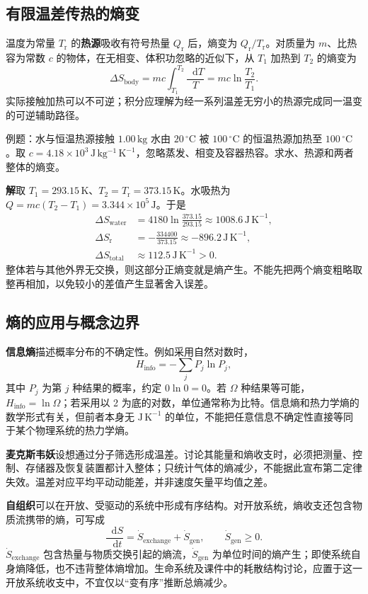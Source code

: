 \documentclass[UTF8,fontset=none,zihao=-4,a4paper]{ctexart}
\newcommand{\term}[1]{\textbf{#1}}
\newcommand{\dd}{\mathop{}\!\mathrm{d}}
\newcommand{\unit}[1]{\,\mathrm{#1}}
\newcommand{\sol}{\par\noindent\textbf{解}\quad}
\begin{document}
\subsection{有限温差传热的熵变}
温度为常量 $T_{\mathrm r}$ 的\term{热源}吸收有符号热量 $Q_{\mathrm r}$ 后，熵变为 $Q_{\mathrm r}/T_{\mathrm r}$。对质量为 $m$、比热容为常数 $c$ 的物体，在无相变、体积功忽略的近似下，从 $T_1$ 加热到 $T_2$ 的熵变为
\[
 \Delta S_{\mathrm{body}}=mc\int_{T_1}^{T_2}\frac{\dd T}{T}
 =mc\ln\frac{T_2}{T_1}.
\]
实际接触加热可以不可逆；积分应理解为经一系列温差无穷小的热源完成同一温变的可逆辅助路径。

\begin{infobox}{例题：水与恒温热源接触}
$1.00\unit{kg}$ 水由 $20\,{}^\circ\mathrm C$ 被 $100\,{}^\circ\mathrm C$ 的恒温热源加热至 $100\,{}^\circ\mathrm C$。取 $c=4.18\times10^3\unit{J\,kg^{-1}\,K^{-1}}$，忽略蒸发、相变及容器热容。求水、热源和两者整体的熵变。
\end{infobox}
\sol 取 $T_1=293.15\unit K$、$T_2=T_{\mathrm r}=373.15\unit K$。水吸热为 $Q=mc(T_2-T_1)=3.344\times10^5\unit J$。于是
\begin{align*}
 \Delta S_{\mathrm{water}}&=4180\ln\frac{373.15}{293.15}
 \approx1008.6\unit{J\,K^{-1}},\\
 \Delta S_{\mathrm r}&=-\frac{334400}{373.15}
 \approx-896.2\unit{J\,K^{-1}},\\
 \Delta S_{\mathrm{total}}&\approx112.5\unit{J\,K^{-1}}>0.
\end{align*}
整体若与其他外界无交换，则这部分正熵变就是熵产生。不能先把两个熵变粗略取整再相加，以免较小的差值产生显著舍入误差。

\subsection{熵的应用与概念边界}
\term{信息熵}描述概率分布的不确定性。例如采用自然对数时，
\[
 H_{\mathrm{info}}=-\sum_jP_j\ln P_j,
\]
其中 $P_j$ 为第 $j$ 种结果的概率，约定 $0\ln0=0$。若 $\Omega$ 种结果等可能，$H_{\mathrm{info}}=\ln\Omega$；若采用以 2 为底的对数，单位通常称为比特。信息熵和热力学熵的数学形式有关，但前者本身无 $\mathrm{J\,K^{-1}}$ 的单位，不能把任意信息不确定性直接等同于某个物理系统的热力学熵。

\term{麦克斯韦妖}设想通过分子筛选形成温差。讨论其能量和熵收支时，必须把测量、控制、存储器及恢复装置都计入整体；只统计气体的熵减少，不能据此宣布第二定律失效。温差对应平均平动动能差，并非速度矢量平均值之差。

\term{自组织}可以在开放、受驱动的系统中形成有序结构。对开放系统，熵收支还包含物质流携带的熵，可写成
\[
 \frac{\dd S}{\dd t}=\dot S_{\mathrm{exchange}}+\dot S_{\mathrm{gen}},
 \qquad\dot S_{\mathrm{gen}}\ge0.
\]
$\dot S_{\mathrm{exchange}}$ 包含热量与物质交换引起的熵流，$\dot S_{\mathrm{gen}}$ 为单位时间的熵产生；即使系统自身熵降低，也不违背整体熵增加。生命系统及课件中的耗散结构讨论，应置于这一开放系统收支中，不宜仅以“变有序”推断总熵减少。
\end{document}
